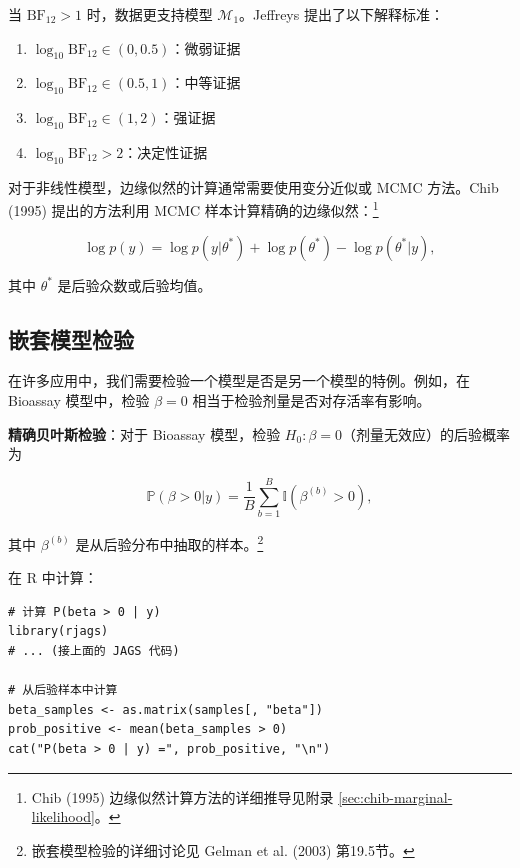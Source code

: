 当 $\mathrm{BF}_{12} > 1$ 时，数据更支持模型 $\mathcal{M}_1$。Jeffreys 提出了以下解释标准：

\begin{enumerate}
  \item $\log_{10} \mathrm{BF}_{12} \in (0, 0.5)$：微弱证据
  \item $\log_{10} \mathrm{BF}_{12} \in (0.5, 1)$：中等证据
  \item $\log_{10} \mathrm{BF}_{12} \in (1, 2)$：强证据
  \item $\log_{10} \mathrm{BF}_{12} > 2$：决定性证据
\end{enumerate}

对于非线性模型，边缘似然的计算通常需要使用变分近似或 MCMC 方法。Chib (1995) 提出的方法利用 MCMC 样本计算精确的边缘似然：\footnote{Chib (1995) 边缘似然计算方法的详细推导见附录 \cref{sec:chib-marginal-likelihood}。}

\begin{equation}
\log p(y) = \log p(y | \theta^*) + \log p(\theta^*) - \log p(\theta^* | y), \label{eq:chib-method}
\end{equation}

其中 $\theta^*$ 是后验众数或后验均值。

\subsection{嵌套模型检验}

在许多应用中，我们需要检验一个模型是否是另一个模型的特例。例如，在 Bioassay 模型中，检验 $\beta = 0$ 相当于检验剂量是否对存活率有影响。

\textbf{精确贝叶斯检验}：对于 Bioassay 模型，检验 $H_0: \beta = 0$（剂量无效应）的后验概率为

\begin{equation}
\mathbb{P}(\beta > 0 | y) = \frac{1}{B} \sum_{b=1}^{B} \mathbb{I}(\beta^{(b)} > 0), \label{eq:bioassay-exact-test}
\end{equation}

其中 $\beta^{(b)}$ 是从后验分布中抽取的样本。\footnote{嵌套模型检验的详细讨论见 Gelman et al. (2003) 第19.5节。}

在 R 中计算：

\begin{verbatim}
# 计算 P(beta > 0 | y)
library(rjags)
# ... (接上面的 JAGS 代码)

# 从后验样本中计算
beta_samples <- as.matrix(samples[, "beta"])
prob_positive <- mean(beta_samples > 0)
cat("P(beta > 0 | y) =", prob_positive, "\n")
\end{verbatim}

